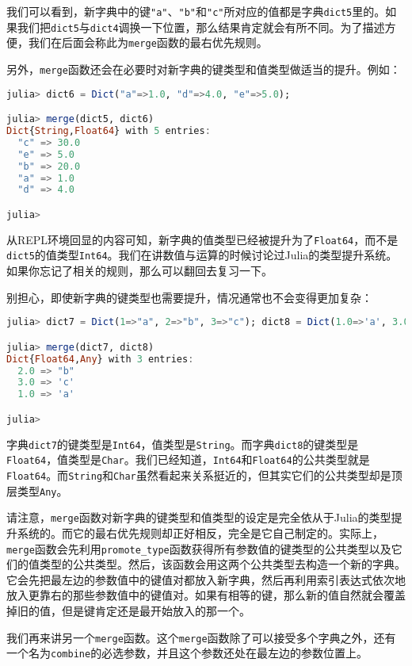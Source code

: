 我们可以看到，新字典中的键\verb`"a"`、\verb`"b"`和\verb`"c"`所对应的值都是字典\verb`dict5`里的。如果我们把\verb`dict5`与\verb`dict4`调换一下位置，那么结果肯定就会有所不同。为了描述方便，我们在后面会称此为\verb`merge`函数的最右优先规则。

另外，\verb`merge`函数还会在必要时对新字典的键类型和值类型做适当的提升。例如：
\begin{lstlisting}[language=julia]
julia> dict6 = Dict("a"=>1.0, "d"=>4.0, "e"=>5.0);

julia> merge(dict5, dict6)
Dict{String,Float64} with 5 entries:
  "c" => 30.0
  "e" => 5.0
  "b" => 20.0
  "a" => 1.0
  "d" => 4.0

julia> 
\end{lstlisting}

从REPL环境回显的内容可知，新字典的值类型已经被提升为了\verb`Float64`，而不是\verb`dict5`的值类型\verb`Int64`。我们在讲数值与运算的时候讨论过Julia的类型提升系统。如果你忘记了相关的规则，那么可以翻回去复习一下。

别担心，即使新字典的键类型也需要提升，情况通常也不会变得更加复杂：
\begin{lstlisting}[language=julia]
julia> dict7 = Dict(1=>"a", 2=>"b", 3=>"c"); dict8 = Dict(1.0=>'a', 3.0=>'c');

julia> merge(dict7, dict8)
Dict{Float64,Any} with 3 entries:
  2.0 => "b"
  3.0 => 'c'
  1.0 => 'a'

julia> 
\end{lstlisting}

字典\verb`dict7`的键类型是\verb`Int64`，值类型是\verb`String`。而字典\verb`dict8`的键类型是\verb`Float64`，值类型是\verb`Char`。我们已经知道，\verb`Int64`和\verb`Float64`的公共类型就是\verb`Float64`。而\verb`String`和\verb`Char`虽然看起来关系挺近的，但其实它们的公共类型却是顶层类型\verb`Any`。

请注意，\verb`merge`函数对新字典的键类型和值类型的设定是完全依从于Julia的类型提升系统的。而它的最右优先规则却正好相反，完全是它自己制定的。实际上，\verb`merge`函数会先利用\verb`promote_type`函数获得所有参数值的键类型的公共类型以及它们的值类型的公共类型。然后，该函数会用这两个公共类型去构造一个新的字典。它会先把最左边的参数值中的键值对都放入新字典，然后再利用索引表达式依次地放入更靠右的那些参数值中的键值对。如果有相等的键，那么新的值自然就会覆盖掉旧的值，但是键肯定还是最开始放入的那一个。

我们再来讲另一个\verb`merge`函数。这个\verb`merge`函数除了可以接受多个字典之外，还有一个名为\verb`combine`的必选参数，并且这个参数还处在最左边的参数位置上。

